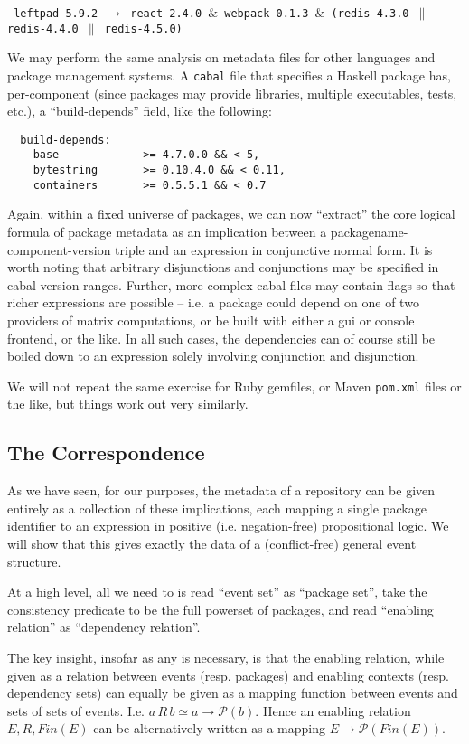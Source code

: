 \documentclass[hoptionsi,review,screen,format=sigconf]{acmart}
\theoremstyle{definition}
\newcommand{\Pc}{\mathcal{P}}
\newcommand{\band}{\mathop{\&}}
\newcommand{\bor}{\mathop{\|}}
\begin{document}
\smallskip
\texttt{
leftpad-5.9.2 $\to$ react-2.4.0 $\band$ webpack-0.1.3 $\band$ (redis-4.3.0 $\bor$ redis-4.4.0 $\bor$ redis-4.5.0)
}
\smallskip

We may perform the same analysis on metadata files for other languages and package management systems. A \texttt{cabal} file that specifies a Haskell package has, per-component (since packages may provide libraries, multiple executables, tests, etc.), a ``build-depends'' field, like the following:

\begin{verbatim}
  build-depends:
    base             >= 4.7.0.0 && < 5,
    bytestring       >= 0.10.4.0 && < 0.11,
    containers       >= 0.5.5.1 && < 0.7
\end{verbatim}

Again, within a fixed universe of packages, we can now ``extract'' the core logical formula of package metadata as an implication between a packagename-component-version triple and an expression in conjunctive normal form. It is worth noting that arbitrary disjunctions and conjunctions may be specified in cabal version ranges. Further, more complex cabal files may contain flags so that richer expressions are possible -- i.e. a package could depend on one of two providers of matrix computations, or be built with either a gui or console frontend, or the like. In all such cases, the dependencies can of course still be boiled down to an expression solely involving conjunction and disjunction.

We will not repeat the same exercise for Ruby gemfiles, or Maven \texttt{pom.xml} files or the like, but things work out very similarly.

\subsection{The Correspondence}

As we have seen, for our purposes, the metadata of a repository can be given entirely as a collection of these implications, each mapping a single package identifier to an expression in positive (i.e. negation-free) propositional logic. We will show that this gives exactly the data of a (conflict-free) general event structure.

At a high level, all we need to is read ``event set'' as ``package set'', take the consistency predicate to be the full powerset of packages, and read ``enabling relation'' as ``dependency relation''. 

The key insight, insofar as any is necessary, is that the enabling relation, while given as a relation between events (resp. packages) and enabling contexts (resp. dependency sets) can equally be given as a mapping function between events and sets of sets of events. I.e. \(a \, R \, b \simeq a \to \Pc(b)\). Hence an enabling relation \(E, R, Fin(E)\) can be alternatively written as a mapping \(E \to \Pc(Fin(E))\).
\end{document}
